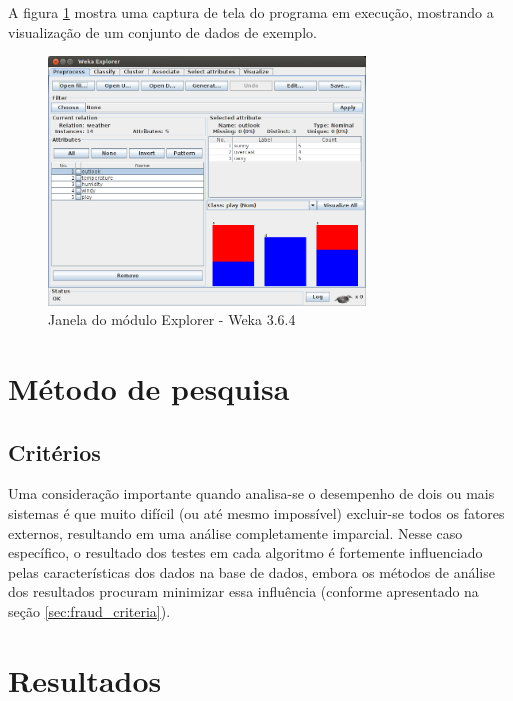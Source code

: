 A figura \ref{fig:prop_weka} mostra uma captura de tela do programa em execução, mostrando a visualização de um conjunto de dados de exemplo.

\begin{figure}[h!]
\centering
\includegraphics[width=0.75\textwidth]{img/weka.png}
\caption{Janela do módulo Explorer - Weka 3.6.4}
\label{fig:prop_weka}
\end{figure}

\section{Método de pesquisa}

\subsection{Critérios}

Uma consideração importante quando analisa-se o desempenho de dois ou mais sistemas é que muito difícil (ou até mesmo impossível) excluir-se todos os fatores externos, resultando em uma análise completamente imparcial. Nesse caso específico, o resultado dos testes em cada algoritmo é fortemente influenciado pelas características dos dados na base de dados, embora os métodos de análise dos resultados procuram minimizar essa influência (conforme apresentado na seção \ref{sec:fraud_criteria}).

\section{Resultados}

